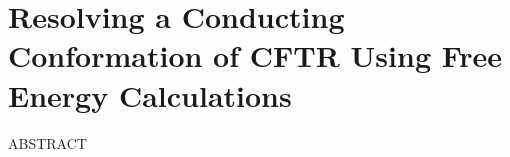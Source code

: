 \chapter{Resolving a Conducting Conformation of CFTR Using Free Energy Calculations}
\label{chap:opening}
ABSTRACT \newline
